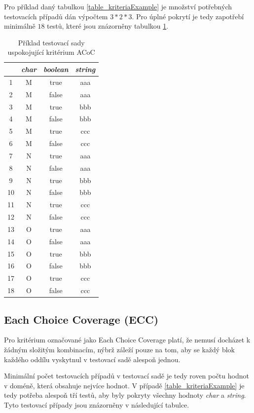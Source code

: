 Pro příklad daný tabulkou \ref{table_kriteriaExample} je množství potřebných testovacích případů dán výpočtem $3*2*3$. Pro úplné pokrytí je tedy zapotřebí minimálně $18$ testů, které jsou znázorněny tabulkou \ref{table_acoc}.

\begin{table}[h!]
\centering
\begin{tabular}{ |c|c c c| } 
 \hline
 & \textit{char} & \textit{boolean} & \textit{string} \\
 \hline
1 & M & true & aaa \\
2 & M & false & aaa \\
3 & M & true & bbb \\
4 & M & false & bbb \\
5 & M & true & ccc \\
6 & M & false & ccc \\
7 & N & true & aaa \\
8 & N & false & aaa \\
9 & N & true & bbb \\
10 & N & false & bbb \\
11 & N & true & ccc \\
12 & N & false & ccc \\
13 & O & true & aaa \\
14 & O & false & aaa \\
15 & O & true & bbb \\
16 & O & false & bbb \\
17 & O & true & ccc \\
18 & O & false & ccc \\
 \hline
\end{tabular}
\caption{Příklad testovací sady uspokojující kritérium ACoC}
\label{table_acoc}
\end{table}


\subsection*{Each Choice Coverage (ECC)}
\label{subsec_ecc}

Pro kritérium označované jako Each Choice Coverage platí, že nemusí docházet k žádným složitým kombinacím, nýbrž záleží pouze na tom, aby se každý blok každého oddílu vyskytnul v testovací sadě alespoň jednou. 

Minimální počet testovacích případů v testovací sadě je tedy roven počtu hodnot v doméně, která obsahuje nejvíce hodnot. V případě \ref{table_kriteriaExample} je tedy potřeba alespoň tří testů, aby byly pokryty všechny hodnoty \textit{char} a \textit{string}. Tyto testovací případy jsou znázorněny v následující tabulce.


